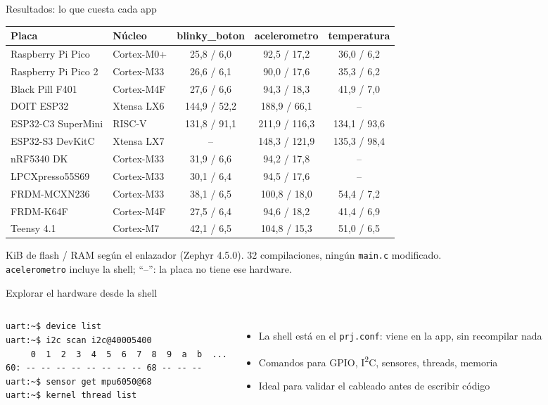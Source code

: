\documentclass[aspectratio=169]{beamer}
\begin{document}
\begin{frame}{Resultados: lo que cuesta cada app}
\centering
\scriptsize
\begin{tabular}{llccc}
\toprule
\textbf{Placa} & \textbf{Núcleo} & \textbf{blinky\_boton} & \textbf{acelerometro} & \textbf{temperatura} \\
\midrule
Raspberry Pi Pico & Cortex-M0+ & 25,8 / 6,0 & 92,5 / 17,2 & 36,0 / 6,2 \\
Raspberry Pi Pico 2 & Cortex-M33 & 26,6 / 6,1 & 90,0 / 17,6 & 35,3 / 6,2 \\
Black Pill F401 & Cortex-M4F & 27,6 / 6,6 & 94,3 / 18,3 & 41,9 / 7,0 \\
DOIT ESP32 & Xtensa LX6 & 144,9 / 52,2 & 188,9 / 66,1 & -- \\
ESP32-C3 SuperMini & RISC-V & 131,8 / 91,1 & 211,9 / 116,3 & 134,1 / 93,6 \\
ESP32-S3 DevKitC & Xtensa LX7 & -- & 148,3 / 121,9 & 135,3 / 98,4 \\
nRF5340 DK & Cortex-M33 & 31,9 / 6,6 & 94,2 / 17,8 & -- \\
LPCXpresso55S69 & Cortex-M33 & 30,1 / 6,4 & 94,5 / 17,6 & -- \\
FRDM-MCXN236 & Cortex-M33 & 38,1 / 6,5 & 100,8 / 18,0 & 54,4 / 7,2 \\
FRDM-K64F & Cortex-M4F & 27,5 / 6,4 & 94,6 / 18,2 & 41,4 / 6,9 \\
Teensy 4.1 & Cortex-M7 & 42,1 / 6,5 & 104,8 / 15,3 & 51,0 / 6,5 \\
\bottomrule
\end{tabular}

\vspace{0.4em}
\footnotesize KiB de flash / RAM según el enlazador (Zephyr 4.5.0). 32 compilaciones, \alert{ningún \texttt{main.c} modificado}.\\
\texttt{acelerometro} incluye la shell; ``--'': la placa no tiene ese hardware.
\end{frame}

\begin{frame}[fragile]{Explorar el hardware desde la shell}
\begin{columns}[T]
\begin{lstlisting}
uart:~$ device list
uart:~$ i2c scan i2c@40005400
     0  1  2  3  4  5  6  7  8  9  a  b  ...
60: -- -- -- -- -- -- -- -- 68 -- -- --
uart:~$ sensor get mpu6050@68
uart:~$ kernel thread list
\end{lstlisting}
\begin{itemize}
    \item La shell está en el \texttt{prj.conf}: viene en la app, sin recompilar nada
    \item Comandos para GPIO, I\textsuperscript{2}C, sensores, threads, memoria
    \item Ideal para validar el cableado antes de escribir código
\end{itemize}
\end{columns}
\end{frame}
\end{document}
